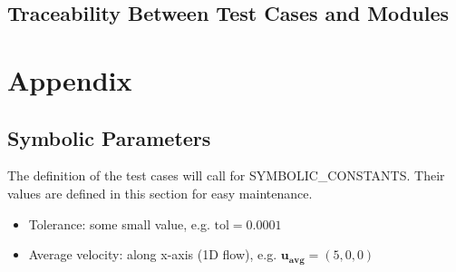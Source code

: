 \documentclass[12pt, titlepage]{article}
\begin{document}
\subsection{Traceability Between Test Cases and Modules}

				




\newpage

\section{Appendix}


\subsection{Symbolic Parameters} \label{secSymParams}

The definition of the test cases will call for SYMBOLIC\_CONSTANTS.
Their values are defined in this section for easy maintenance.

\begin{itemize}
  \item Tolerance: some small value, e.g. $\text{tol}=0.0001$
  \item Average velocity: along x-axis (1D flow), e.g. $\mathbf{u_{avg}}=(5,0,0)$
\end{itemize}






\end{document}
